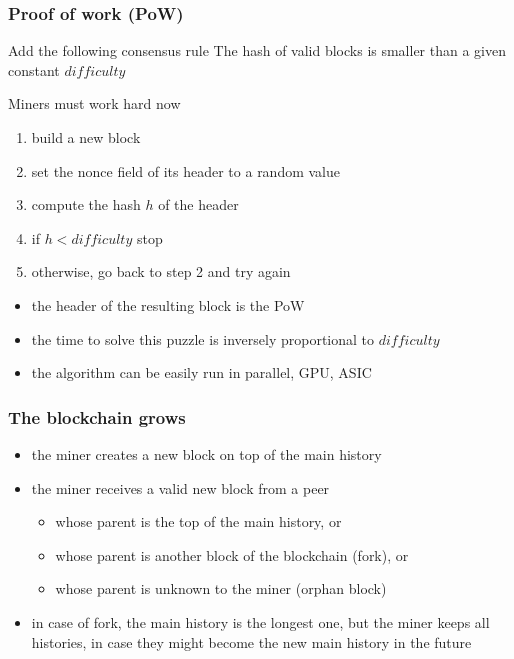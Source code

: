\documentclass[11pt]{beamer}  %
\begin{document}
\begin{frame}\frametitle{Proof of work (PoW)}

  \begin{greenbox}{Add the following consensus rule}
    The hash of valid blocks is smaller than
    a given constant $\mathit{difficulty}$
  \end{greenbox}

  \bigskip

  \begin{greenbox}{Miners must work hard now}
    \begin{enumerate}
    \item build a new block
    \item set the nonce field of its header to a random value
    \item compute the hash $h$ of the header
    \item if $h < \mathit{difficulty}$ stop
    \item otherwise, go back to step 2 and try again
    \end{enumerate}
  \end{greenbox}

  \bigskip

  \begin{itemize}
  \item the header of the resulting block is the PoW
  \item the time to solve this puzzle is inversely proportional to $\mathit{difficulty}$
  \item the algorithm can be easily run in parallel, GPU, ASIC
  \end{itemize}

\end{frame}

\begin{frame}\frametitle{The blockchain grows}

  \begin{itemize}
  \item the miner creates a new block on top of the main history
  \item the miner receives a valid new block from a peer
    \begin{itemize}
    \item whose parent is the top of the main history, or
    \item whose parent is another block of the blockchain (fork), or
    \item whose parent is unknown to the miner (orphan block)
    \end{itemize}
  \item in case of fork, the main history is the longest one, but the miner keeps all histories,
    in case they might become the new main history in the future
  \end{itemize}
  
\end{frame}
\end{document}
